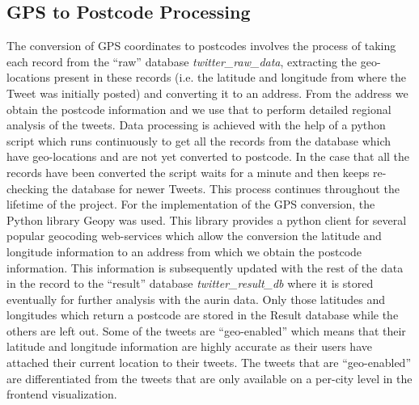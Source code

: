 \documentclass[11pt, oneside]{article}
\begin{document}
\subsection{GPS to Postcode Processing}
\label{sec:gps_to_postcode_processing}
The conversion of GPS coordinates to postcodes involves the process of taking each record from the \enquote{raw} database \textit{twitter\_raw\_data}, extracting the geo-locations present in these records (i.e. the latitude and longitude from where the Tweet was initially posted) and converting it to an address. From the address we obtain the postcode information and we use that to perform detailed regional analysis of the tweets. 
\newline
\newline
Data processing is achieved with the help of a python script which runs continuously to get all the records from the database which have geo-locations and are not yet converted to postcode. In the case that all the records have been converted the script waits for a minute and then keeps re-checking the database for newer Tweets. This process continues throughout the lifetime of the project.
\newline
\newline
For the implementation of the GPS conversion, the Python library Geopy \citep{geopy} was used. This library provides a python client for several popular geocoding web-services which allow the conversion the latitude and longitude information to an address from which we obtain the postcode information. This information is subsequently updated with the rest of the data in the record to the \enquote{result} database \textit{twitter\_result\_db} where it is stored eventually for further analysis with the \acrshort{aurin} data.
\newline
\newline
Only those latitudes and longitudes which return a postcode are stored in the Result database while the others are left out. Some of the tweets are \enquote{geo-enabled} which means that their latitude and longitude information are highly accurate as their users have attached their current location to their tweets. The tweets that are \enquote{geo-enabled} are differentiated from the tweets that are only available on a per-city level in the frontend visualization. 
\end{document}
